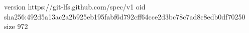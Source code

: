 version https://git-lfs.github.com/spec/v1
oid sha256:492d5a13ac2a2b925eb195fabf6d792cff64cce2d3bc78c7ad8c8edb0df70250
size 972
